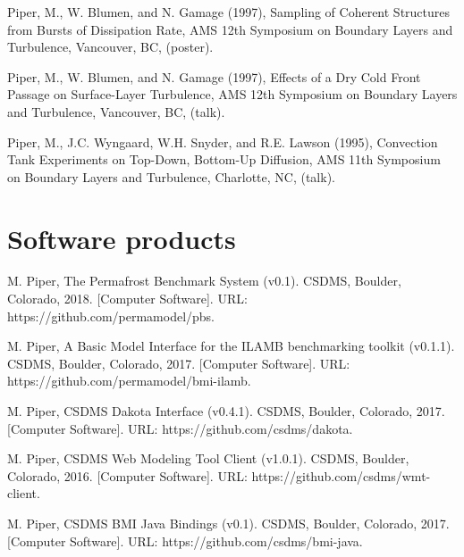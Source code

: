 \documentclass[letterpaper]{resume}
\begin{document}
\begin{enumerate}[{[}1{]}]
  \item Piper, M., W. Blumen, and N. Gamage (1997), Sampling of
    Coherent Structures from Bursts of Dissipation Rate, AMS 12th
    Symposium on Boundary Layers and Turbulence, Vancouver, BC,
    (poster).

  \item Piper, M., W. Blumen, and N. Gamage (1997), Effects of a Dry
    Cold Front Passage on Surface-Layer Turbulence, AMS 12th Symposium
    on Boundary Layers and Turbulence, Vancouver, BC, (talk).

  \item Piper, M., J.C. Wyngaard, W.H. Snyder, and R.E. Lawson (1995),
    Convection Tank Experiments on Top-Down, Bottom-Up Diffusion, AMS
    11th Symposium on Boundary Layers and Turbulence, Charlotte, NC,
    (talk).

\end{enumerate}


\section{Software products}
\vspace{0.5em}

\begin{enumerate}[{[}1{]}]

  \item M. Piper, The Permafrost Benchmark System (v0.1). CSDMS,
    Boulder, Colorado, 2018. [Computer Software]. URL:
    https://github.com/permamodel/pbs.

  \item M. Piper, A Basic Model Interface for the ILAMB benchmarking
    toolkit (v0.1.1). CSDMS, Boulder, Colorado, 2017. [Computer
      Software]. URL: https://github.com/permamodel/bmi-ilamb.

  \item M. Piper, CSDMS Dakota Interface (v0.4.1). CSDMS, Boulder,
    Colorado, 2017. [Computer Software]. URL:
    https://github.com/csdms/dakota.

  \item M. Piper, CSDMS Web Modeling Tool Client (v1.0.1). CSDMS,
    Boulder, Colorado, 2016. [Computer Software]. URL:
    https://github.com/csdms/wmt-client.

 \item M. Piper, CSDMS BMI Java Bindings (v0.1). CSDMS, Boulder,
   Colorado, 2017. [Computer Software]. URL:
   https://github.com/csdms/bmi-java.

\end{enumerate}
\end{document}
